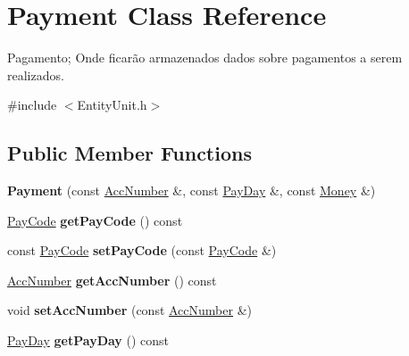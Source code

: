 \hypertarget{classPayment}{\section{Payment Class Reference}
\label{classPayment}
}


Pagamento; Onde ficarão armazenados dados sobre pagamentos a serem realizados.  




{\ttfamily \#include $<$Entity\-Unit.\-h$>$}

\subsection*{Public Member Functions}
\begin{DoxyCompactItemize}
\item 
\hypertarget{classPayment_a91b7742c5f9b4617e4a3bce6507cce49}{{\bfseries Payment} (const \hyperlink{classAccNumber}{Acc\-Number} \&, const \hyperlink{classPayDay}{Pay\-Day} \&, const \hyperlink{classMoney}{Money} \&)}\label{classPayment_a91b7742c5f9b4617e4a3bce6507cce49}

\item 
\hypertarget{classPayment_a1d71998fa33e757bb350eb40895865ae}{\hyperlink{classPayCode}{Pay\-Code} {\bfseries get\-Pay\-Code} () const }\label{classPayment_a1d71998fa33e757bb350eb40895865ae}

\item 
\hypertarget{classPayment_adf458db6331e53948a473a04a0d622a4}{const \hyperlink{classPayCode}{Pay\-Code} {\bfseries set\-Pay\-Code} (const \hyperlink{classPayCode}{Pay\-Code} \&)}\label{classPayment_adf458db6331e53948a473a04a0d622a4}

\item 
\hypertarget{classPayment_a66c51330aef2e045884e25618a194904}{\hyperlink{classAccNumber}{Acc\-Number} {\bfseries get\-Acc\-Number} () const }\label{classPayment_a66c51330aef2e045884e25618a194904}

\item 
\hypertarget{classPayment_a5d0e83f83f090acf4b33bc81f5391ca0}{void {\bfseries set\-Acc\-Number} (const \hyperlink{classAccNumber}{Acc\-Number} \&)}\label{classPayment_a5d0e83f83f090acf4b33bc81f5391ca0}

\item 
\hypertarget{classPayment_a22ee22d04f3f5757f115386aa3337c51}{\hyperlink{classPayDay}{Pay\-Day} {\bfseries get\-Pay\-Day} () const }\label{classPayment_a22ee22d04f3f5757f115386aa3337c51}


\end{DoxyCompactItemize}
